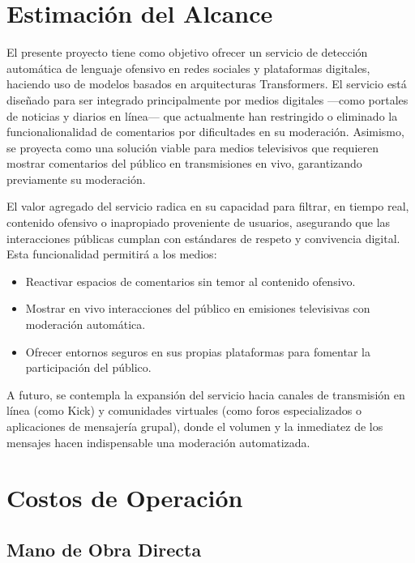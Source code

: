 \section{Estimación del Alcance}

El presente proyecto tiene como objetivo ofrecer un servicio de detección automática de lenguaje ofensivo en redes sociales y plataformas digitales, haciendo uso de modelos basados en arquitecturas Transformers. El servicio está diseñado para ser integrado principalmente por medios digitales ---como portales de noticias y diarios en línea--- que actualmente han restringido o eliminado la funcionalionalidad de comentarios por dificultades en su moderación. Asimismo, se proyecta como una solución viable para medios televisivos que requieren mostrar comentarios del público en transmisiones en vivo, garantizando previamente su moderación.

El valor agregado del servicio radica en su capacidad para filtrar, en tiempo real, contenido ofensivo o inapropiado proveniente de usuarios, asegurando que las interacciones públicas cumplan con estándares de respeto y convivencia digital. Esta funcionalidad permitirá a los medios:

\begin{itemize}
    \item Reactivar espacios de comentarios sin temor al contenido ofensivo.
    
    \item Mostrar en vivo interacciones del público en emisiones televisivas con moderación automática.
    
    \item Ofrecer entornos seguros en sus propias plataformas para fomentar la participación del público.
\end{itemize}

A futuro, se contempla la expansión del servicio hacia canales de transmisión en línea (como Kick) y comunidades virtuales (como foros especializados o aplicaciones de mensajería grupal), donde el volumen y la inmediatez de los mensajes hacen indispensable una moderación automatizada.

\section{Costos de Operación}

\subsection{Mano de Obra Directa}

